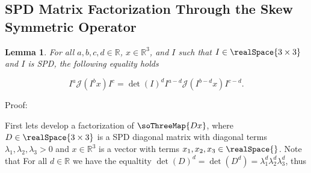 \subsection{\acl{SPD} Matrix Factorization Through the Skew 
  Symmetric Operator}
%

\newtheorem{PDS3_Factorization}{Lemma}[section]

\begin{PDS3_Factorization}
\label{chModels.theo.PDS3_Factorization}
For all $a,b,c,d\in\mathbb{R}$, $x\in\mathbb{R}^3$, and $I$ such that
$I\in\realSpace{3\times 3}$ and $I$ is \ac{SPD}, the following
equality holds

\begin{equation}
\label{chModels.eq.PDS3_Factorization}
I^a\mathcal{J}\left(I^b x\right)I^c=\det(I)^d I^{a-d}\mathcal{J}
\left(I^{b-d} x\right)I^{c-d}.
\end{equation}

\end{PDS3_Factorization}

\noindent Proof:

First lets develop a factorization of $\soThreeMap{Dx}$, where
$D\in\realSpace{3\times 3}$ is a \ac{SPD} diagonal matrix with
diagonal terms $\lambda_1,\lambda_2,\lambda_3>0$ and
$x\in\mathbb{R}^3$ is a vector with terms
$x_1,x_2,x_3\in\realSpace{}$.  Note that For all $d\in\mathbb{R}$ we
have the equaltity
$\det\left(D\right)^d=\det\left(D^d\right)=\lambda_1^d\lambda_2^d\lambda_3^d$,
thus


